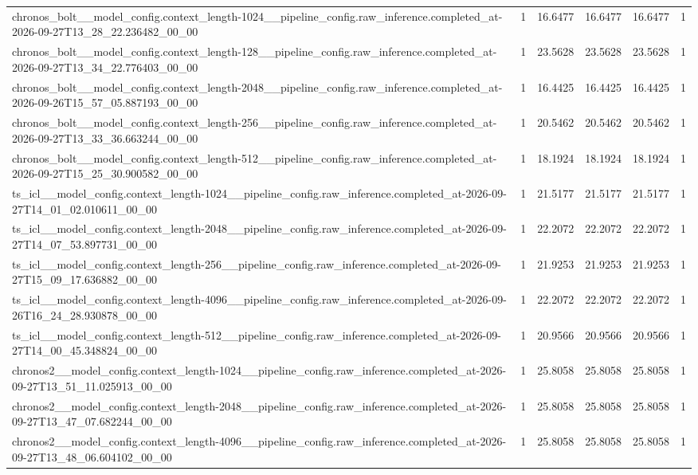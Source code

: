 \begin{tabular}{llllll}
chronos\_bolt\_\_model\_config.context\_length-1024\_\_pipeline\_config.raw\_inference.completed\_at-2026-09-27T13\_28\_22.236482\_00\_00 & 1 & 16.6477 & 16.6477 & 16.6477 & 1 \\
chronos\_bolt\_\_model\_config.context\_length-128\_\_pipeline\_config.raw\_inference.completed\_at-2026-09-27T13\_34\_22.776403\_00\_00 & 1 & 23.5628 & 23.5628 & 23.5628 & 1 \\
chronos\_bolt\_\_model\_config.context\_length-2048\_\_pipeline\_config.raw\_inference.completed\_at-2026-09-26T15\_57\_05.887193\_00\_00 & 1 & 16.4425 & 16.4425 & 16.4425 & 1 \\
chronos\_bolt\_\_model\_config.context\_length-256\_\_pipeline\_config.raw\_inference.completed\_at-2026-09-27T13\_33\_36.663244\_00\_00 & 1 & 20.5462 & 20.5462 & 20.5462 & 1 \\
chronos\_bolt\_\_model\_config.context\_length-512\_\_pipeline\_config.raw\_inference.completed\_at-2026-09-27T15\_25\_30.900582\_00\_00 & 1 & 18.1924 & 18.1924 & 18.1924 & 1 \\
ts\_icl\_\_model\_config.context\_length-1024\_\_pipeline\_config.raw\_inference.completed\_at-2026-09-27T14\_01\_02.010611\_00\_00 & 1 & 21.5177 & 21.5177 & 21.5177 & 1 \\
ts\_icl\_\_model\_config.context\_length-2048\_\_pipeline\_config.raw\_inference.completed\_at-2026-09-27T14\_07\_53.897731\_00\_00 & 1 & 22.2072 & 22.2072 & 22.2072 & 1 \\
ts\_icl\_\_model\_config.context\_length-256\_\_pipeline\_config.raw\_inference.completed\_at-2026-09-27T15\_09\_17.636882\_00\_00 & 1 & 21.9253 & 21.9253 & 21.9253 & 1 \\
ts\_icl\_\_model\_config.context\_length-4096\_\_pipeline\_config.raw\_inference.completed\_at-2026-09-26T16\_24\_28.930878\_00\_00 & 1 & 22.2072 & 22.2072 & 22.2072 & 1 \\
ts\_icl\_\_model\_config.context\_length-512\_\_pipeline\_config.raw\_inference.completed\_at-2026-09-27T14\_00\_45.348824\_00\_00 & 1 & 20.9566 & 20.9566 & 20.9566 & 1 \\
chronos2\_\_model\_config.context\_length-1024\_\_pipeline\_config.raw\_inference.completed\_at-2026-09-27T13\_51\_11.025913\_00\_00 & 1 & 25.8058 & 25.8058 & 25.8058 & 1 \\
chronos2\_\_model\_config.context\_length-2048\_\_pipeline\_config.raw\_inference.completed\_at-2026-09-27T13\_47\_07.682244\_00\_00 & 1 & 25.8058 & 25.8058 & 25.8058 & 1 \\
chronos2\_\_model\_config.context\_length-4096\_\_pipeline\_config.raw\_inference.completed\_at-2026-09-27T13\_48\_06.604102\_00\_00 & 1 & 25.8058 & 25.8058 & 25.8058 & 1 \\

\end{tabular}
